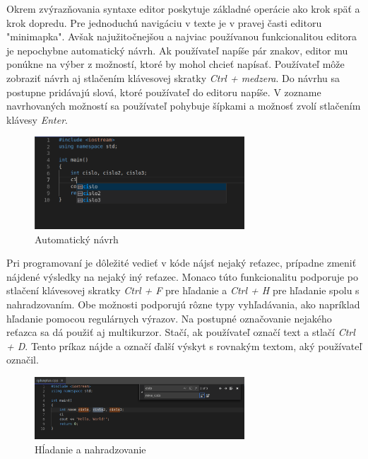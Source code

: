 Okrem zvýrazňovania syntaxe editor poskytuje základné operácie ako krok späť a krok dopredu. Pre
jednoduchú navigáciu v texte je v pravej časti editoru "minimapka". Avšak najužitočnejšou a
najviac používanou funkcionalitou editora je nepochybne automatický návrh. Ak používateľ napíše pár
znakov, editor mu ponúkne na výber z možností, ktoré by mohol chcieť napísať. Používateľ môže
zobraziť návrh aj stlačením klávesovej skratky \textit{Ctrl + medzera}. Do návrhu sa postupne
pridávajú slová, ktoré používateľ do editoru napíše. V zozname navrhovaných možností sa používateľ
pohybuje šípkami a možnosť zvolí stlačením klávesy \textit{Enter}.
\begin{figure}[H]
\centerline{\includegraphics[width=0.7\textwidth]{images/automaticky_navrh}}
\caption[Automatický návrh]{Automatický návrh}
\label{obr:automaticky_navrh}
\end{figure}

Pri programovaní je dôležité vedieť v kóde nájsť nejaký reťazec, prípadne zmeniť nájdené výsledky na
nejaký iný reťazec. Monaco túto funkcionalitu podporuje po stlačení klávesovej skratky \textit{Ctrl
+ F} pre hľadanie a \textit{Ctrl + H} pre hľadanie spolu s nahradzovaním. Obe možnosti podporujú
rôzne typy vyhľadávania, ako napríklad hľadanie pomocou regulárnych výrazov. Na postupné označovanie
nejakého reťazca sa dá použiť aj multikurzor. Stačí, ak používateľ označí text a stlačí \textit{Ctrl
+ D}. Tento príkaz nájde a označí ďalší výskyt s rovnakým textom, aký používateľ označil. 
\begin{figure}[H]
\centerline{\includegraphics[width=0.7\textwidth]{images/hladanie_nahradzovanie}}
\caption[Hĺadanie a nahradzovanie]{Hĺadanie a nahradzovanie}
\label{obr:hladanie_nahradzovanie}
\end{figure}

